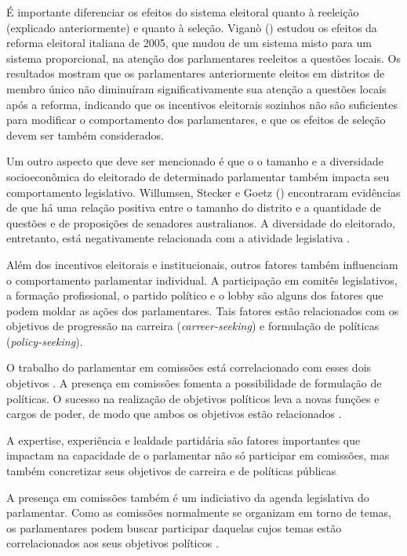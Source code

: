É importante diferenciar os efeitos do sistema eleitoral quanto à reeleição (explicado anteriormente) e quanto à seleção. Viganò (\citeyear{vigano2024electoral}) estudou os efeitos da reforma eleitoral italiana de 2005, que mudou de um sistema misto para um sistema proporcional, na atenção dos parlamentares reeleitos a questões locais. Os resultados mostram que os parlamentares anteriormente eleitos em distritos de membro único não diminuíram significativamente sua atenção a questões locais após a reforma, indicando que os incentivos eleitorais sozinhos não são suficientes para modificar o comportamento dos parlamentares, e que os efeitos de seleção devem ser também considerados.

Um outro aspecto que deve ser mencionado é que o o tamanho e a diversidade socioeconômica do eleitorado de determinado parlamentar também impacta seu comportamento legislativo. Willumsen, Stecker e Goetz (\citeyear{willumsen_electoral_2019}) encontraram evidências de que há uma relação positiva entre o tamanho do distrito e a quantidade de questões e de proposições de senadores australianos. A diversidade do eleitorado, entretanto, está negativamente relacionada com a atividade legislativa \cite{willumsen_electoral_2019}.

Além dos incentivos eleitorais e institucionais, outros fatores também influenciam o comportamento parlamentar individual. A participação em comitês legislativos, a formação profissional, o partido político e o lobby são alguns dos fatores que podem moldar as ações dos parlamentares. Tais fatores estão relacionados com os objetivos de progressão na carreira (\textit{carreer-seeking}) e formulação de políticas (\textit{policy-seeking}).

O trabalho do parlamentar em comissões está correlacionado com esses dois objetivos \cite{daniel2015career}. A presença em comissões fomenta a possibilidade de formulação de políticas. O sucesso na realização de objetivos políticos leva a novas funções e cargos de poder, de modo que ambos os objetivos estão relacionados \cite{daniel2015career}. 

A expertise, experiência e lealdade partidária são fatores importantes que impactam na capacidade de o parlamentar não só participar em comissões, mas também concretizar seus objetivos de carreira e de políticas públicas \cite{chiru2020loyal}

A presença em comissões também é um indiciativo da agenda legislativa do parlamentar. Como as comissões normalmente se organizam em torno de temas, os parlamentares podem buscar participar daquelas cujos temas estão correlacionados aos seus objetivos políticos \cite{schiller1995senators}.

